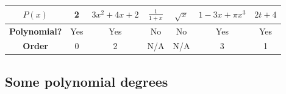 \begin{example}
\hspace{1em}
\begin{center}
    \begin{tabular}{ | c | c | c | c | c | c | c |}
    \hline
    $P(x)$  & 2 & $3x^2+4x+2$ & $\frac{1}{1+x}$ & $\sqrt{x}$ & $1-3x+\pi x^3$ & $2t+4$  \\ \hline
    \textbf{Polynomial?} & Yes & Yes & No & No & Yes & Yes  \\ \hline
    \textbf{Order} & 0 & 2 & N/A & N/A & 3 & 1  \\ \hline
    \end{tabular}
\end{center}
\end{example}

\subsection{Some polynomial degrees}
